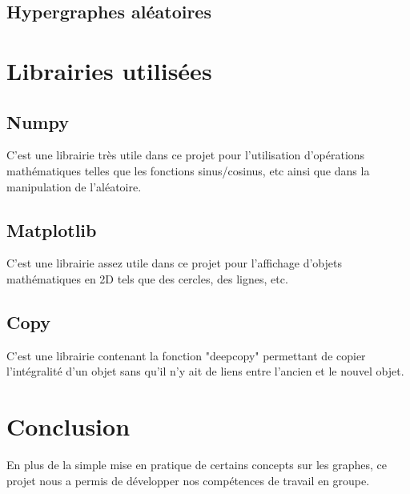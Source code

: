 \documentclass{article}
\begin{document}
	
	\subsection{Hypergraphes aléatoires}
	
\section{Librairies utilisées}

	\subsection{Numpy}
		C'est une librairie très utile dans ce projet pour l'utilisation d'opérations mathématiques telles que les fonctions sinus/cosinus, etc ainsi que dans la manipulation de l'aléatoire.

	\subsection{Matplotlib}
		C'est une librairie assez utile dans ce projet pour l'affichage d'objets mathématiques en 2D tels que des cercles, des lignes, etc.
	
	\subsection{Copy}
		C'est une librairie contenant la fonction "deepcopy" permettant de copier l'intégralité d'un objet sans qu'il n'y ait de liens entre l'ancien et le nouvel objet.

\section{Conclusion}
	En plus de la simple mise en pratique de certains concepts sur les graphes, ce projet nous a permis de développer nos compétences de travail en groupe.
\end{document}
